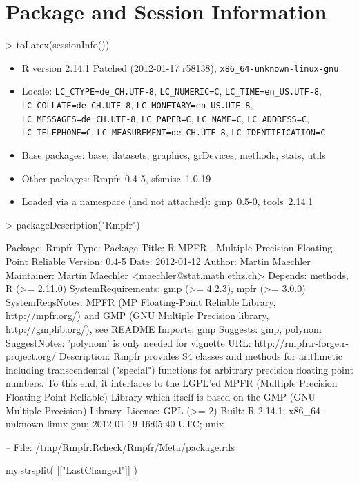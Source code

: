 \section{Package and Session Information}
\begin{frame}[fragile]%
\begin{Schunk}
\begin{Sinput}
> toLatex(sessionInfo())
\end{Sinput}
\begin{itemize}\raggedright
  \item R version 2.14.1 Patched (2012-01-17 r58138), \verb|x86_64-unknown-linux-gnu|
  \item Locale: \verb|LC_CTYPE=de_CH.UTF-8|, \verb|LC_NUMERIC=C|, \verb|LC_TIME=en_US.UTF-8|, \verb|LC_COLLATE=de_CH.UTF-8|, \verb|LC_MONETARY=en_US.UTF-8|, \verb|LC_MESSAGES=de_CH.UTF-8|, \verb|LC_PAPER=C|, \verb|LC_NAME=C|, \verb|LC_ADDRESS=C|, \verb|LC_TELEPHONE=C|, \verb|LC_MEASUREMENT=de_CH.UTF-8|, \verb|LC_IDENTIFICATION=C|
  \item Base packages: base, datasets, graphics, grDevices,
    methods, stats, utils
  \item Other packages: Rmpfr~0.4-5, sfsmisc~1.0-19
  \item Loaded via a namespace (and not attached): gmp~0.5-0,
    tools~2.14.1
\end{itemize}\end{Schunk}
\end{frame}
\begin{frame}[fragile]%
\begin{Schunk}
\begin{Sinput}
> packageDescription("Rmpfr")
\end{Sinput}
\begin{Soutput}
Package: Rmpfr
Type: Package
Title: R MPFR - Multiple Precision Floating-Point Reliable
Version: 0.4-5
Date: 2012-01-12
Author: Martin Maechler
Maintainer: Martin Maechler <maechler@stat.math.ethz.ch>
Depends: methods, R (>= 2.11.0)
SystemRequirements: gmp (>= 4.2.3), mpfr (>= 3.0.0)
SystemReqsNotes: MPFR (MP Floating-Point Reliable Library,
       http://mpfr.org/) and GMP (GNU Multiple Precision library,
       http://gmplib.org/), see README
Imports: gmp
Suggests: gmp, polynom
SuggestNotes: 'polynom' is only needed for vignette
URL: http://rmpfr.r-forge.r-project.org/
Description: Rmpfr provides S4 classes and methods for arithmetic
       including transcendental ("special") functions for
       arbitrary precision floating point numbers. To this end, it
       interfaces to the LGPL'ed MPFR (Multiple Precision
       Floating-Point Reliable) Library which itself is based on
       the GMP (GNU Multiple Precision) Library.
License: GPL (>= 2)
Built: R 2.14.1; x86_64-unknown-linux-gnu; 2012-01-19 16:05:40
       UTC; unix

-- File: /tmp/Rmpfr.Rcheck/Rmpfr/Meta/package.rds 
\end{Soutput}
\end{Schunk}
my.strsplit(  [["LastChanged"]]  )
\end{frame}


